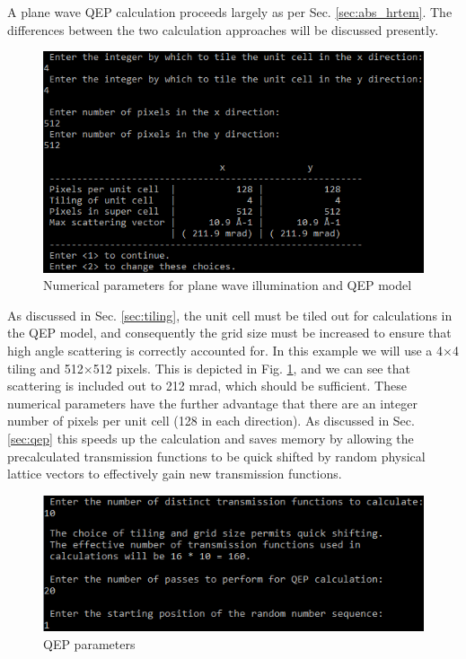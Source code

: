 \documentclass[12pt,a4paper]{article}
\newcommand{\by}{$\times$}
\begin{document}
A plane wave QEP calculation proceeds largely as per Sec. \ref{sec:abs_hrtem}. 
The differences between the two calculation approaches will be discussed presently.

\begin{figure}[!h]
\begin{center}
    \includegraphics[scale=0.75]{pw_qep_numerical.png}
\caption{Numerical parameters for plane wave illumination and QEP model}
\label{fig:pw_qep_numerical}
\end{center}
\end{figure}

As discussed in Sec. \ref{sec:tiling}, the unit cell must be tiled out for calculations in the QEP model, and consequently the grid size must be increased to ensure that high angle scattering is correctly accounted for.
In this example we will use a 4\by4 tiling and 512\by512 pixels.
This is depicted in Fig. \ref{fig:pw_qep_numerical}, and we can see that scattering is included out to 212 mrad, which should be sufficient.
These numerical parameters have the further advantage that there are an integer number of pixels per unit cell (128 in each direction).
As discussed in Sec. \ref{sec:qep} this speeds up the calculation and saves memory by allowing the precalculated transmission functions to be quick shifted by random physical lattice vectors to effectively gain new transmission functions.

\begin{figure}[!h]
\begin{center}
    \includegraphics[scale=0.75]{pw_qep_qep_questions.png}
\caption{QEP parameters}
\label{fig:pw_qep_qep_questions}
\end{center}
\end{figure}
\end{document}
